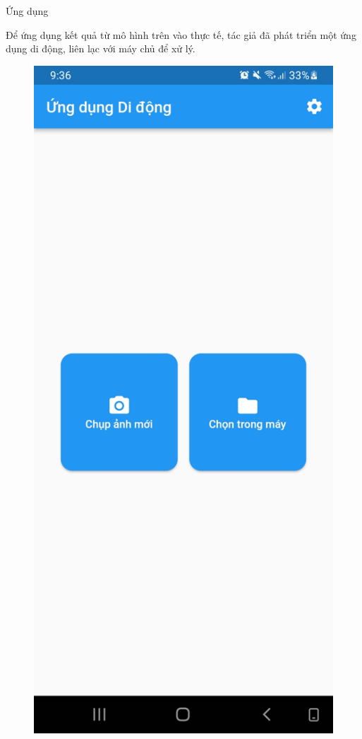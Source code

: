 \documentclass{beamer}
\begin{document}
\begin{frame}[allowframebreaks]{Ứng dụng}
	
	Để ứng dụng kết quả từ mô hình trên vào thực tế, tác giả đã phát triển một ứng dụng di động, liên lạc với máy chủ để xử lý.

	\framebreak

	\begin{figure}[H]
		\centering
		\includegraphics[scale=0.1]{images/screenshot1.jpg}

\end{figure}
\end{frame}
\end{document}
